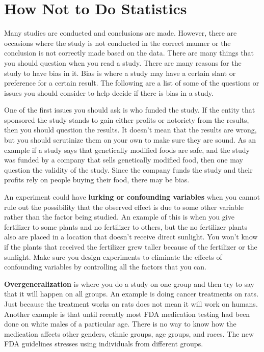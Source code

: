 \documentclass[]{book}
\begin{document}
\hypertarget{how-not-to-do-statistics}{%
\section{How Not to Do Statistics}\label{how-not-to-do-statistics}}

Many studies are conducted and conclusions are made. However, there are occasions where the study is not conducted in the correct manner or the conclusion is not correctly made based on the data. There are many things that you should question when you read a study. There are many reasons for the study to have bias in it. Bias is where a study may have a certain slant or preference for a certain result. The following are a list of some of the questions or issues you should consider to help decide if there is bias in a study.

One of the first issues you should ask is who funded the study. If the entity that sponsored the study stands to gain either profits or notoriety from the results, then you should question the results. It doesn't mean that the results are wrong, but you should scrutinize them on your own to make sure they are sound. As an example if a study says that genetically modified foods are safe, and the study was funded by a company that sells genetically modified food, then one may question the validity of the study. Since the company funds the study and their profits rely on people buying their food, there may be bias.

An experiment could have \textbf{lurking or confounding variables} when you cannot rule out the possibility that the observed effect is due to some other variable rather than the factor being studied. An example of this is when you give fertilizer to some plants and no fertilizer to others, but the no fertilizer plants also are placed in a location that doesn't receive direct sunlight. You won't know if the plants that received the fertilizer grew taller because of the fertilizer or the sunlight. Make sure you design experiments to eliminate the effects of confounding variables by controlling all the factors that you can.

\textbf{Overgeneralization} is where you do a study on one group and then try to say that it will happen on all groups. An example is doing cancer treatments on rats. Just because the treatment works on rats does not mean it will work on humans. Another example is that until recently most FDA medication testing had been done on white males of a particular age. There is no way to know how the medication affects other genders, ethnic groups, age groups, and races. The new FDA guidelines stresses using individuals from different groups.
\end{document}

